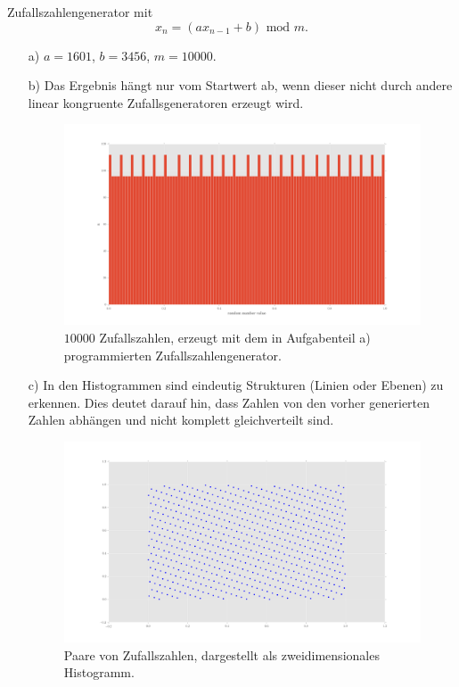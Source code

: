 \begin{itemize}
Zufallszahlengenerator mit
\begin{equation}
x_n=(ax_{n-1}+b) \text{ mod } m .
\end{equation}

\begin{itemize}


\item[a)] $a=1601$, $b=3456$, $m=10000$.
\item[b)] Das Ergebnis hängt nur vom Startwert ab, wenn dieser nicht durch andere linear kongruente Zufallsgeneratoren erzeugt wird.
\begin{figure}
\centering
\includegraphics[width=\textwidth]{linear_kongruent_random_numbers.png}
\caption{$10000$ Zufallszahlen, erzeugt mit dem in Aufgabenteil a) programmierten Zufallszahlengenerator.}
\label{fig:2b}
\end{figure}
\item[c)] In den Histogrammen sind eindeutig Strukturen (Linien oder Ebenen) zu erkennen. Dies deutet darauf hin, dass Zahlen von den vorher generierten Zahlen abhängen und nicht komplett gleichverteilt sind.
\begin{figure}
\centering
\includegraphics[width=\textwidth]{2dscatter.png}
\caption{Paare von Zufallszahlen, dargestellt als zweidimensionales Histogramm.}
\label{fig:2c1}
\end{figure}


\end{itemize}
\end{itemize}
